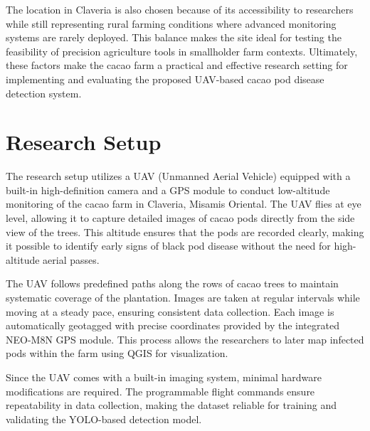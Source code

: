 The location in Claveria is also chosen because of its accessibility to researchers while still representing rural farming conditions where advanced monitoring systems are rarely deployed. 
This balance makes the site ideal for testing the feasibility of precision agriculture tools in smallholder farm contexts. 
Ultimately, these factors make the cacao farm a practical and effective research setting for implementing and evaluating the proposed UAV-based cacao pod disease detection system.


\section{Research Setup}

The research setup utilizes a UAV (Unmanned Aerial Vehicle) equipped with a built-in high-definition camera and a GPS module to conduct low-altitude monitoring of the cacao farm in Claveria, Misamis Oriental. 
The UAV flies at eye level, allowing it to capture detailed images of cacao pods directly from the side view of the trees. 
This altitude ensures that the pods are recorded clearly, making it possible to identify early signs of black pod disease without the need for high-altitude aerial passes.

The UAV follows predefined paths along the rows of cacao trees to maintain systematic coverage of the plantation. 
Images are taken at regular intervals while moving at a steady pace, ensuring consistent data collection. 
Each image is automatically geotagged with precise coordinates provided by the integrated NEO-M8N GPS module. 
This process allows the researchers to later map infected pods within the farm using QGIS for visualization.

Since the UAV comes with a built-in imaging system, minimal hardware modifications are required. 
The programmable flight commands ensure repeatability in data collection, making the dataset reliable for training and validating the YOLO-based detection model.

